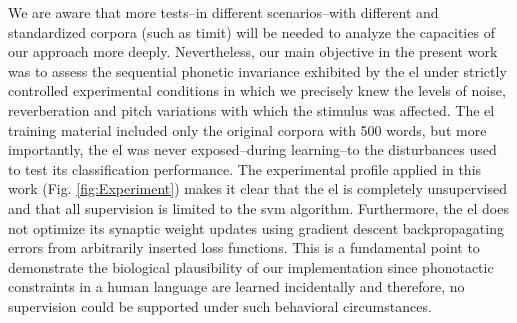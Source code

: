 {We are aware that more tests--in different scenarios--with different and standardized corpora (such as \gls{timit}) will be needed to analyze the capacities of our approach more deeply.
Nevertheless, our main objective in the present work was to assess the sequential phonetic invariance exhibited by the \gls{el} under strictly controlled experimental conditions in which we precisely knew the levels of noise, reverberation and pitch variations with which the stimulus was affected. The \gls{el} training material included only the original corpora with 500 words, but more importantly, the \gls{el} was never exposed--during learning--to the disturbances used to test its classification performance. The experimental profile applied in this work (Fig. \ref{fig:Experiment}) makes it clear that the \gls{el} is completely unsupervised and that all supervision is limited to the \gls{svm} algorithm. Furthermore, the \gls{el} does not optimize its synaptic weight updates using gradient descent backpropagating errors from arbitrarily inserted loss functions. This is a fundamental point to demonstrate the biological plausibility of our implementation since phonotactic constraints in a human language are learned incidentally \cite{BRENT199693,saffran_1997} and therefore, no supervision could be supported under such behavioral circumstances. 

}
